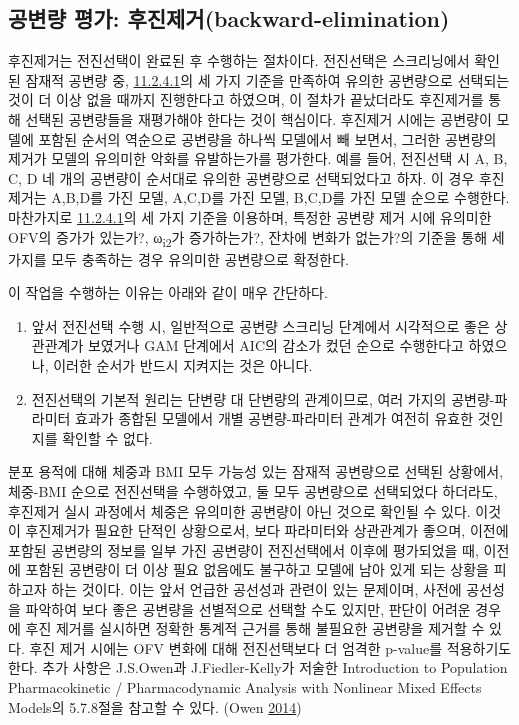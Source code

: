 \documentclass[
  10pt,
  krantz2,
  a4paper]{krantz}
\providecommand{\tightlist}{%
  \setlength{\itemsep}{0pt}\setlength{\parskip}{0pt}}
\theoremstyle{definition}
\theoremstyle{definition}
\theoremstyle{definition}
\theoremstyle{remark}
\begin{document}
\hypertarget{uxacf5uxbcc0uxb7c9-uxd3c9uxac00-uxd6c4uxc9c4uxc81cuxac70backward-elimination}{%
\subsection{공변량 평가: 후진제거(backward-elimination)}\label{uxacf5uxbcc0uxb7c9-uxd3c9uxac00-uxd6c4uxc9c4uxc81cuxac70backward-elimination}}

후진제거는 전진선택이 완료된 후 수행하는 절차이다. 전진선택은 스크리닝에서 확인된 잠재적 공변량 중, \protect\hyperlink{forward-sel-def}{11.2.4.1}의 세 가지 기준을 만족하여 유의한 공변량으로 선택되는 것이 더 이상 없을 때까지 진행한다고 하였으며, 이 절차가 끝났더라도 후진제거를 통해 선택된 공변량들을 재평가해야 한다는 것이 핵심이다. 후진제거 시에는 공변량이 모델에 포함된 순서의 역순으로 공변량을 하나씩 모델에서 빼 보면서, 그러한 공변량의 제거가 모델의 유의미한 악화를 유발하는가를 평가한다. 예를 들어, 전진선택 시 A, B, C, D 네 개의 공변량이 순서대로 유의한 공변량으로 선택되었다고 하자. 이 경우 후진 제거는 A,B,D를 가진 모델, A,C,D를 가진 모델, B,C,D를 가진 모델 순으로 수행한다. 마찬가지로 \protect\hyperlink{forward-sel-def}{11.2.4.1}의 세 가지 기준을 이용하며, 특정한 공변량 제거 시에 유의미한 OFV의 증가가 있는가?, ω\textsubscript{i2}가 증가하는가?, 잔차에 변화가 없는가?의 기준을 통해 세 가지를 모두 충족하는 경우 유의미한 공변량으로 확정한다.

이 작업을 수행하는 이유는 아래와 같이 매우 간단하다.

\begin{enumerate}
\def\labelenumi{\arabic{enumi}.}
\tightlist
\item
  앞서 전진선택 수행 시, 일반적으로 공변량 스크리닝 단계에서 시각적으로 좋은 상관관계가 보였거나 GAM 단계에서 AIC의 감소가 컸던 순으로 수행한다고 하였으나, 이러한 순서가 반드시 지켜지는 것은 아니다.
\item
  전진선택의 기본적 원리는 단변량 대 단변량의 관계이므로, 여러 가지의 공변량-파라미터 효과가 종합된 모델에서 개별 공변량-파라미터 관계가 여전히 유효한 것인지를 확인할 수 없다.
\end{enumerate}

분포 용적에 대해 체중과 BMI 모두 가능성 있는 잠재적 공변량으로 선택된 상황에서, 체중-BMI 순으로 전진선택을 수행하였고, 둘 모두 공변량으로 선택되었다 하더라도, 후진제거 실시 과정에서 체중은 유의미한 공변량이 아닌 것으로 확인될 수 있다. 이것이 후진제거가 필요한 단적인 상황으로서, 보다 파라미터와 상관관계가 좋으며, 이전에 포함된 공변량의 정보를 일부 가진 공변량이 전진선택에서 이후에 평가되었을 때, 이전에 포함된 공변량이 더 이상 필요 없음에도 불구하고 모델에 남아 있게 되는 상황을 피하고자 하는 것이다. 이는 앞서 언급한 공선성과 관련이 있는 문제이며, 사전에 공선성을 파악하여 보다 좋은 공변량을 선별적으로 선택할 수도 있지만, 판단이 어려운 경우에 후진 제거를 실시하면 정확한 통계적 근거를 통해 불필요한 공변량을 제거할 수 있다. 후진 제거 시에는 OFV 변화에 대해 전진선택보다 더 엄격한 p-value를 적용하기도 한다. 추가 사항은 J.S.Owen과 J.Fiedler-Kelly가 저술한 Introduction to Population Pharmacokinetic / Pharmacodynamic Analysis with Nonlinear Mixed Effects Models의 5.7.8절을 참고할 수 있다. (Owen \protect\hyperlink{ref-kelly}{2014})
\end{document}
